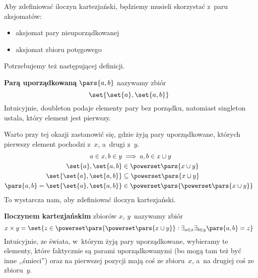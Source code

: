 Aby zdefiniować iloczyn kartezjański, będziemy musieli skorzystać z~paru aksjomatów:
\begin{itemize}
	\item aksjomat pary nieuporządkowanej
	\item aksjomat zbioru potęgowego
\end{itemize}
Potrzebujemy też następującej definicji.
\begin{definition}
	\label{mfi:cartesian_and_relations:cartesian_definitions:def:ordered_pair}
	\textbf{Parą uporządkowaną} \(\pars{a, b}\) nazywamy zbiór
	\begin{equation*}
		\set{\set{a}, \set{a, b}}
	\end{equation*}
	Intuicyjnie, doubleton podaje elementy pary bez porządku, natomiast singleton ustala, który element jest pierwszy.
\end{definition}
Warto przy tej okazji zastanowić się, gdzie żyją pary uporządkowane, których pierwszy element pochodzi z~\(x\), a~drugi z~\(y\).
\begin{align*}
	a \in x, b \in y                        & \implies a, b \in x \cup y                   \\
	\set{a}, \set{a, b}                     & \in \powerset\pars{x \cup y}                 \\
	\set{\set{a}, \set{a, b}}               & \subseteq \powerset\pars{x \cup y}           \\
	\pars{a, b} = \set{\set{a}, \set{a, b}} & \in \powerset\pars{\powerset\pars{x \cup y}}
\end{align*}
To wystarcza nam, aby zdefiniować iloczyn kartezjański.
\begin{definition}
	\textbf{Iloczynem kartezjańskim} zbiorów \(x\), \(y\)~nazywamy zbiór
	\begin{equation*}
		x \times y = \set{z \in \powerset\pars{\powerset\pars{x \cup y}} : \exists_{a \in x}\exists_{b \in y} \pars{a, b} = z}
	\end{equation*}
	Intuicyjnie, ze świata, w~którym żyją pary uporządkowane, wybieramy te elementy, które faktycznie są parami uporządkowanymi (bo mogą tam też być inne ,,śmieci'') oraz na pierwszej pozycji mają coś ze zbioru~\(x\), a~na drugiej coś ze zbioru~\(y\).
\end{definition}
